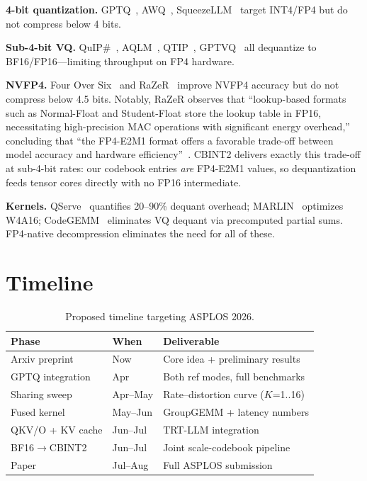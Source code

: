 \documentclass[11pt,a4paper]{article}
\begin{document}
\textbf{4-bit quantization.}
GPTQ~\cite{frantar2023gptq}, AWQ~\cite{lin2024awq}, SqueezeLLM~\cite{kim2024squeezellm} target INT4/FP4 but do not compress below 4 bits.

\textbf{Sub-4-bit VQ.}
QuIP\#~\cite{tseng2024quipsharp}, AQLM~\cite{egiazarian2024aqlm}, QTIP~\cite{tseng2024qtip}, GPTVQ~\cite{vanbaalen2024gptvq} all dequantize to BF16/FP16---limiting throughput on FP4 hardware.

\textbf{NVFP4.}
Four Over Six~\cite{cook2025fouroversix} and RaZeR~\cite{chen2026razer} improve NVFP4 accuracy but do not compress below 4.5 bits.
Notably, RaZeR observes that ``lookup-based formats such as Normal-Float and Student-Float store the lookup table in FP16, necessitating high-precision MAC operations with significant energy overhead,'' concluding that ``the FP4-E2M1 format offers a favorable trade-off between model accuracy and hardware efficiency''~\cite{chen2026razer}.
CBINT2 delivers exactly this trade-off at sub-4-bit rates: our codebook entries \emph{are} FP4-E2M1 values, so dequantization feeds tensor cores directly with no FP16 intermediate.

\textbf{Kernels.}
QServe~\cite{lin2025qserve} quantifies 20--90\% dequant overhead; MARLIN~\cite{frantar2024marlin} optimizes W4A16; CodeGEMM~\cite{park2025codegemm} eliminates VQ dequant via precomputed partial sums.
FP4-native decompression eliminates the need for all of these.

\section{Timeline}

\begin{table}[h]
\centering
\caption{Proposed timeline targeting ASPLOS 2026.}
\label{tab:timeline}
\begin{tabular}{lll}
\toprule
\textbf{Phase} & \textbf{When} & \textbf{Deliverable} \\
\midrule
Arxiv preprint & Now & Core idea + preliminary results \\
GPTQ integration & Apr & Both ref modes, full benchmarks \\
Sharing sweep & Apr--May & Rate--distortion curve ($K$=1..16) \\
Fused kernel & May--Jun & GroupGEMM + latency numbers \\
QKV/O + KV cache & Jun--Jul & TRT-LLM integration \\
BF16$\to$CBINT2 & Jun--Jul & Joint scale-codebook pipeline \\
Paper & Jul--Aug & Full ASPLOS submission \\
\bottomrule
\end{tabular}
\end{table}
\end{document}
